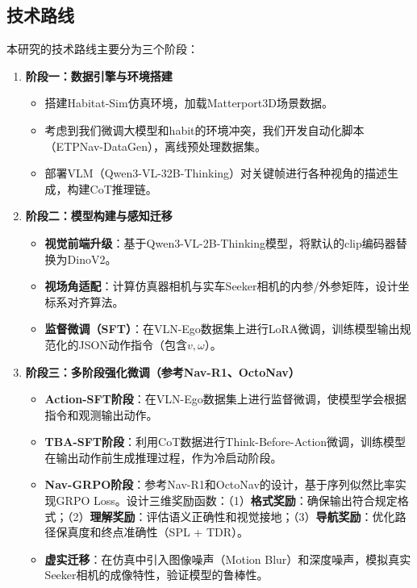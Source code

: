 \subsection{技术路线}
本研究的技术路线主要分为三个阶段：
\begin{enumerate}
    \item \textbf{阶段一：数据引擎与环境搭建}
    \begin{itemize}
        \item 搭建Habitat-Sim仿真环境，加载Matterport3D场景数据。
        \item 考虑到我们微调大模型和habit的环境冲突，我们开发自动化脚本（ETPNav-DataGen），离线预处理数据集。
        \item 部署VLM（Qwen3-VL-32B-Thinking）对关键帧进行各种视角的描述生成，构建CoT推理链。
    \end{itemize}
    \item \textbf{阶段二：模型构建与感知迁移}
    \begin{itemize}
        \item \textbf{视觉前端升级}：基于Qwen3-VL-2B-Thinking模型，将默认的clip编码器替换为DinoV2。
        \item \textbf{视场角适配}：计算仿真器相机与实车Seeker相机的内参/外参矩阵，设计坐标系对齐算法。
        \item \textbf{监督微调（SFT）}：在VLN-Ego数据集上进行LoRA微调，训练模型输出规范化的JSON动作指令（包含$v, \omega$）。
    \end{itemize}
    \item \textbf{阶段三：多阶段强化微调（参考Nav-R1、OctoNav）}
    \begin{itemize}
        \item \textbf{Action-SFT阶段}：在VLN-Ego数据集上进行监督微调，使模型学会根据指令和观测输出动作。
        \item \textbf{TBA-SFT阶段}：利用CoT数据进行Think-Before-Action微调，训练模型在输出动作前生成推理过程，作为冷启动阶段。
        \item \textbf{Nav-GRPO阶段}：参考Nav-R1\cite{nav_r1}和OctoNav\cite{octonav}的设计，基于序列似然比率实现GRPO Loss。设计三维奖励函数：（1）\textbf{格式奖励}：确保输出符合规定格式；（2）\textbf{理解奖励}：评估语义正确性和视觉接地；（3）\textbf{导航奖励}：优化路径保真度和终点准确性（SPL + TDR）。
        \item \textbf{虚实迁移}：在仿真中引入图像噪声（Motion Blur）和深度噪声，模拟真实Seeker相机的成像特性，验证模型的鲁棒性。
    \end{itemize}
\end{enumerate}

